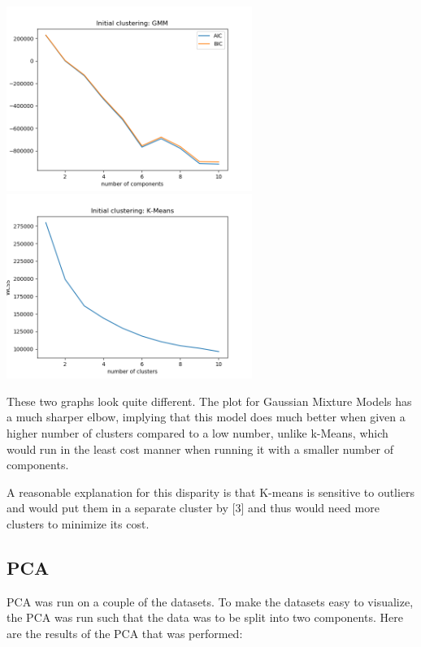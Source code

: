 \documentclass[11pt]{article}
\begin{document}
            \includegraphics[width=8cm]{../mushrooms/clustering1/gmm_init.png}
            \includegraphics[width=8cm]{../mushrooms/clustering1/km_init.png}

            These two graphs look quite different. The plot for Gaussian Mixture
            Models has a much sharper elbow, implying that this model does much
            better when given a higher number of clusters compared to a low number,
            unlike k-Means, which would run in the least cost manner when running
            it with a smaller number of components.

            A reasonable explanation for this disparity is that
            K-means is sensitive to outliers and would put them in a separate
            cluster by [3] and thus would need more clusters to minimize its cost.


            
            \subsection{PCA}

                PCA was run on a couple of the datasets. To make the datasets easy to visualize, the
                PCA was run such that the data was to be split into two components. Here are the
                results of the PCA that was performed:
\end{document}
